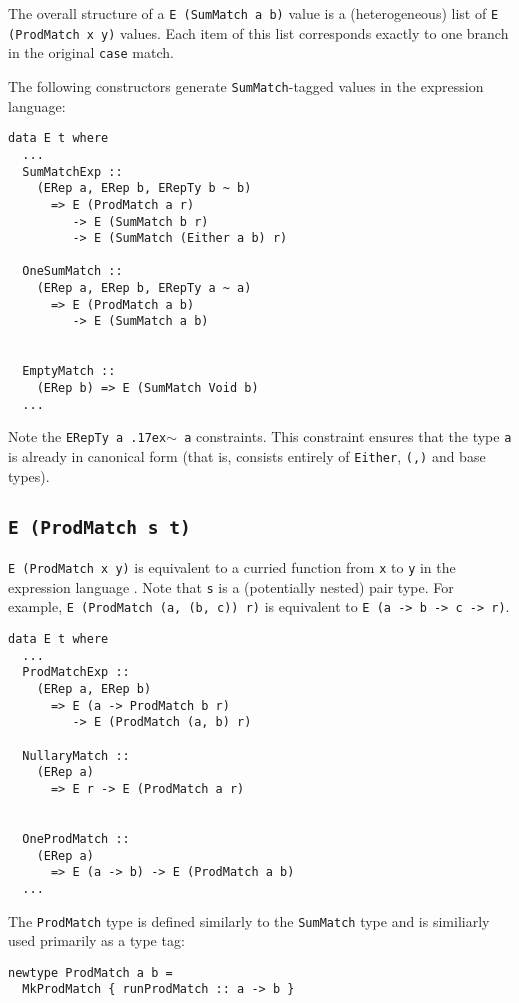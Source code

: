 \documentclass[sigplan,screen]{acmart}
\newcommand{\typeeq}{\raise.17ex\hbox{$\scriptstyle\mathtt{\sim}$}\,}
\newcommand{\ttt}{\texttt}
\begin{document}
The overall structure of a \ttt{E (SumMatch a b)} value is a (heterogeneous)
list of \ttt{E (ProdMatch x y)} values.  Each item of this list corresponds
exactly to one branch in the original \ttt{case} match.

The following constructors generate \ttt{SumMatch}-tagged values in the
expression language:

\begin{lstlisting}
data E t where
  ...
  SumMatchExp ::
    (ERep a, ERep b, ERepTy b ~ b)
      => E (ProdMatch a r)
         -> E (SumMatch b r)
         -> E (SumMatch (Either a b) r)

  OneSumMatch ::
    (ERep a, ERep b, ERepTy a ~ a)
      => E (ProdMatch a b)
         -> E (SumMatch a b)


  EmptyMatch ::
    (ERep b) => E (SumMatch Void b)
  ...
\end{lstlisting}

Note the \ttt{ERepTy a \typeeq a} constraints. This constraint ensures that the type
\ttt{a} is already in canonical form (that is, consists entirely of
\ttt{Either}, \ttt{(,)} and base types).

\subsection{\ttt{E (ProdMatch s t)}}

\ttt{E (ProdMatch x y)} is equivalent to a curried function from \ttt{x} to
\ttt{y} in the expression language .  Note that \ttt{s} is a (potentially
nested) pair type. For example, \ttt{E (ProdMatch (a, (b, c)) r)} is
equivalent to \ttt{E (a -> b -> c -> r)}.

\begin{lstlisting}
data E t where
  ...
  ProdMatchExp ::
    (ERep a, ERep b)
      => E (a -> ProdMatch b r)
         -> E (ProdMatch (a, b) r)

  NullaryMatch ::
    (ERep a)
      => E r -> E (ProdMatch a r)


  OneProdMatch ::
    (ERep a)
      => E (a -> b) -> E (ProdMatch a b)
  ...
\end{lstlisting}

The \ttt{ProdMatch} type is defined similarly to the \ttt{SumMatch} type and is
similiarly used primarily as a type tag:

\begin{lstlisting}
newtype ProdMatch a b =
  MkProdMatch { runProdMatch :: a -> b }
\end{lstlisting}
\end{document}
